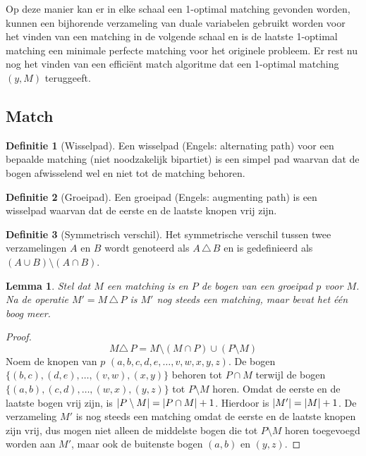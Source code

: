 \documentclass[conference]{IEEEtran}
\newtheorem{lemma}{Lemma}[section]
\theoremstyle{definition}
\newtheorem{definition}{Definitie}[section]
\DeclarePairedDelimiter{\card}{\vert}{\vert}  %
\begin{document}
Op deze manier kan er in elke schaal een 1-optimal matching gevonden worden, kunnen een bijhorende verzameling van duale variabelen gebruikt worden voor het vinden van een matching in de volgende schaal en is de laatste 1-optimal matching een minimale perfecte matching voor het originele probleem. Er rest nu nog het vinden van een efficiënt match algoritme dat een 1-optimal matching $(y, M)$ teruggeeft.
    
\subsection{Match}
\begin{definition}[Wisselpad]
    Een wisselpad (Engels: alternating path) voor een bepaalde matching (niet noodzakelijk bipartiet) is een simpel pad waarvan dat de bogen afwisselend wel en niet tot de matching behoren.
\end{definition}

\begin{definition}[Groeipad]
    Een groeipad (Engels: augmenting path) is een wisselpad waarvan dat de eerste en de laatste knopen vrij zijn.
\end{definition}

\begin{definition}[Symmetrisch verschil]
    Het symmetrische verschil tussen twee verzamelingen $A$ en $B$ wordt genoteerd als $A\,\triangle\,B$ en is gedefinieerd als $(A \cup B) \setminus (A \cap B)$.
\end{definition}

\begin{lemma}
    Stel dat $M$ een matching is en $P$ de bogen van een groeipad $p$ voor $M$. Na de operatie $M' = M\, \triangle\, P$ is $M'$ nog steeds een matching, maar bevat het één boog meer.
\end{lemma}
\begin{proof}
    $$M \triangle\, P = M \setminus (M \cap P) \cup (P \setminus M)$$
    Noem de knopen van $p$ $(a, b, c, d, e, \dots, v, w, x, y, z)$. De bogen $\{(b, c), (d, e), \dots, (v, w), (x, y)\}$ behoren tot $P \cap M$ terwijl de bogen $\{(a, b), (c, d), \dots, (w, x), (y, z)\}$ tot $P \setminus M$ horen. Omdat de eerste en de laatste bogen vrij zijn, is $\card{P \setminus M} = \card{P \cap M} + 1$. Hierdoor is $\card{M'} = \card{M} + 1$. De verzameling $M'$ is nog steeds een matching omdat de eerste en de laatste knopen zijn vrij, dus mogen niet alleen de middelste bogen die tot $P \setminus M$ horen toegevoegd worden aan $M'$, maar ook de buitenste bogen $(a, b)$ en $(y, z)$.
\end{proof}
\end{document}
